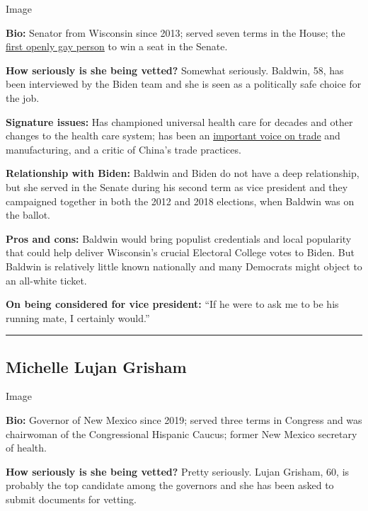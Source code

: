 Image

\textbf{Bio:} Senator from Wisconsin since 2013; served seven terms in
the House; the
\href{https://www.nytimes.com/2012/11/04/fashion/tammy-baldwin-on-the-edge-of-making-history.html}{first
openly gay person} to win a seat in the Senate.

\textbf{How seriously is she being vetted?} Somewhat seriously. Baldwin,
58, has been interviewed by the Biden team and she is seen as a
politically safe choice for the job.

\textbf{Signature issues:} Has championed universal health care for
decades and other changes to the health care system; has been an
\href{https://www.nytimes.com/2017/08/02/us/politics/senate-democrats-seek-to-outdo-trump-on-trade.html}{important
voice on trade} and manufacturing, and a critic of China's trade
practices.

\textbf{Relationship with Biden:} Baldwin and Biden do not have a deep
relationship, but she served in the Senate during his second term as
vice president and they campaigned together in both the 2012 and 2018
elections, when Baldwin was on the ballot.

\textbf{Pros and cons:} Baldwin would bring populist credentials and
local popularity that could help deliver Wisconsin's crucial Electoral
College votes to Biden. But Baldwin is relatively little known
nationally and many Democrats might object to an all-white ticket.

\textbf{On being considered for vice president:} ``If he were to ask me
to be his running mate, I certainly would.''

\begin{center}\rule{0.5\linewidth}{\linethickness}\end{center}

\hypertarget{michelle-lujan-grisham}{%
\subsection{Michelle Lujan Grisham}\label{michelle-lujan-grisham}}

Image

\textbf{Bio:} Governor of New Mexico since 2019; served three terms in
Congress and was chairwoman of the Congressional Hispanic Caucus; former
New Mexico secretary of health.

\textbf{How seriously is she being vetted?} Pretty seriously. Lujan
Grisham, 60, is probably the top candidate among the governors and she
has been asked to submit documents for vetting.

